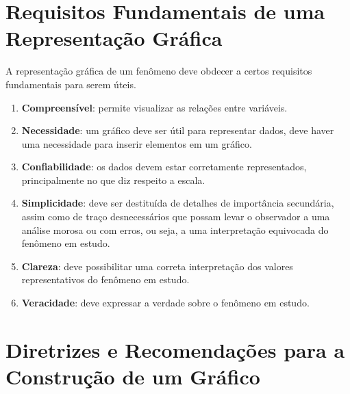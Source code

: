 \section{Requisitos Fundamentais de uma Representação Gráfica}

A representação gráfica de um fenômeno deve obdecer a certos requisitos fundamentais para serem úteis.

\begin{enumerate}

\item \textbf{Compreensível}: permite visualizar as relações entre variáveis.
\item \textbf{Necessidade}: um gráfico deve ser útil para representar dados, deve haver uma necessidade para inserir elementos em um gráfico.
\item \textbf{Confiabilidade}: os dados devem estar corretamente representados, principalmente no que diz respeito a escala.
\item \textbf{Simplicidade}: deve ser destituída de detalhes de importância secundária, assim como de traço desnecessários que possam levar o observador a uma análise morosa ou com erros, ou seja, a uma interpretação equivocada do fenômeno em estudo. 
\item \textbf{Clareza}: deve possibilitar uma correta interpretação dos valores representativos do fenômeno em estudo. 
\item \textbf{Veracidade}: deve expressar a verdade sobre o fenômeno em estudo.
\end{enumerate}

\section{Diretrizes e Recomendações para a Construção de um Gráfico}

